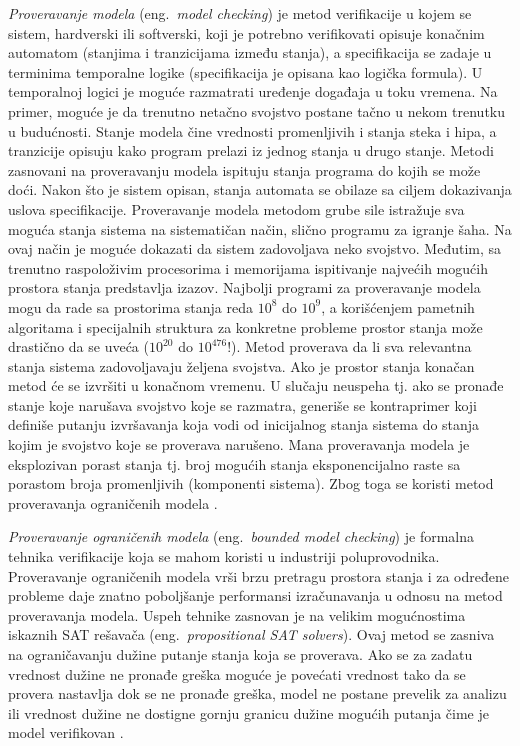 \documentclass[12pt,oneside]{memoir}
\begin{document}
\textit{Proveravanje modela} (eng.~\textit{model checking}) je metod verifikacije u kojem se sistem, hardverski ili softverski, koji je potrebno verifikovati opisuje konačnim automatom (stanjima i tranzicijama između stanja), a specifikacija se zadaje u terminima temporalne logike (specifikacija je opisana kao logička formula). U temporalnoj logici je moguće razmatrati uređenje događaja u toku vremena. Na primer, moguće je da trenutno netačno svojstvo postane tačno u nekom trenutku u budućnosti. Stanje modela čine vrednosti promenljivih i stanja steka i hipa, a tranzicije opisuju kako program prelazi iz jednog stanja u drugo stanje. Metodi zasnovani na proveravanju modela ispituju stanja programa do kojih se može doći. Nakon što je sistem opisan, stanja automata se obilaze sa ciljem dokazivanja uslova specifikacije. Proveravanje modela metodom grube sile istražuje sva moguća stanja sistema na sistematičan način, slično programu za igranje šaha. Na ovaj način je moguće dokazati da sistem zadovoljava neko svojstvo. Međutim, sa trenutno raspoloživim procesorima i memorijama ispitivanje najvećih mogućih prostora stanja predstavlja izazov. Najbolji programi za proveravanje modela mogu da rade sa prostorima stanja reda $10^8$ do $10^9$, a korišćenjem pametnih algoritama i specijalnih struktura za konkretne probleme prostor stanja može drastično da se uveća ($10^{20}$ do $10^{476}$!). Metod proverava da li sva relevantna stanja sistema zadovoljavaju željena svojstva. Ako je prostor stanja konačan metod će se izvršiti u konačnom vremenu. U slučaju neuspeha tj. ako se pronađe stanje koje narušava svojstvo koje se razmatra, generiše se kontraprimer koji definiše putanju izvršavanja koja vodi od inicijalnog stanja sistema do stanja kojim je svojstvo koje se proverava narušeno. Mana proveravanja modela je eksplozivan porast stanja tj. broj mogućih stanja eksponencijalno raste sa porastom broja promenljivih (komponenti sistema). Zbog toga se koristi metod proveravanja ograničenih modela \cite{mvj, AutoTechnFormSofVer, BMCUSS, PoMC}.

\textit{Proveravanje ograničenih modela} (eng.~\textit{bounded model checking})  je formalna tehnika verifikacije koja se mahom koristi u industriji poluprovodnika. Proveravanje ograničenih modela vrši brzu pretragu prostora stanja i za određene probleme daje znatno poboljšanje performansi izračunavanja u odnosu na metod proveravanja modela. Uspeh tehnike zasnovan je na velikim mogućnostima iskaznih SAT rešavača (eng.~\textit{propositional SAT solvers}). Ovaj metod se zasniva na ograničavanju dužine putanje stanja koja se proverava. Ako se za zadatu vrednost dužine ne pronađe greška moguće je povećati vrednost tako da se provera nastavlja dok se ne pronađe greška, model ne postane prevelik za analizu ili vrednost dužine ne dostigne gornju granicu dužine mogućih putanja čime je model verifikovan  \cite{mvj, AutoTechnFormSofVer, BMCUSS}.
\end{document}
